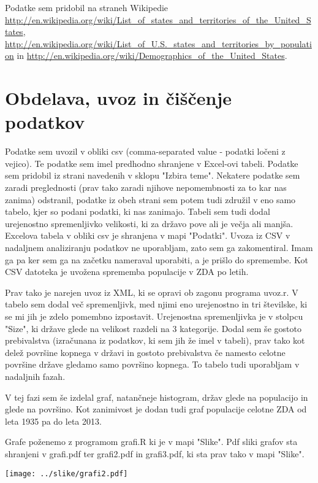 \documentclass[11pt,a4paper]{article}
\begin{document}
Podatke sem pridobil na straneh Wikipedie \url{http://en.wikipedia.org/wiki/List_of_states_and_territories_of_the_United_States}, \url{http://en.wikipedia.org/wiki/List_of_U.S._states_and_territories_by_population} in \url{http://en.wikipedia.org/wiki/Demographics_of_the_United_States}.

\pagebreak

\section{Obdelava, uvoz in čiščenje podatkov}

Podatke sem uvozil v obliki csv (comma-separated value - podatki ločeni z vejico). Te podatke sem imel predhodno shranjene v Excel-ovi tabeli. Podatke sem pridobil iz strani navedenih v sklopu "Izbira teme". 
Nekatere podatke sem zaradi preglednosti (prav tako zaradi njihove nepomembnosti za to kar nas zanima) odstranil, podatke iz obeh strani sem potem tudi združil v eno samo tabelo, kjer so podani podatki, ki nas zanimajo. Tabeli sem tudi dodal urejenostno spremenljivko velikosti, ki za državo pove ali je večja ali manjša. Excelova tabela v obliki csv je shranjena v mapi "Podatki".
Uvoza iz CSV v nadaljnem analiziranju podatkov ne uporabljam, zato sem ga zakomentiral. Imam ga pa ker sem ga na začetku nameraval uporabiti, a je prišlo do spremembe.
Kot CSV datoteka je uvožena sprememba populacije v ZDA po letih.

Prav tako je narejen uvoz iz XML, ki se opravi ob zagonu programa uvoz.r. V tabelo sem dodal več spremenljivk, med njimi eno urejenostno in tri številske, ki se mi jih je zdelo pomembno 
izpostavit. Urejenostna spremenljivka je v stolpcu "Size", ki države glede na velikost razdeli na 3 kategorije. Dodal sem še gostoto prebivalstva (izračunana iz podatkov, ki sem jih že imel v tabeli), prav tako kot delež površine kopnega v državi in gostoto prebivalstva če namesto celotne površine države gledamo samo površino kopnega. To tabelo tudi uporabljam v nadaljnih fazah.

V tej fazi sem še izdelal graf, natančneje histogram, držav glede na populacijo in glede na površino.
Kot zanimivost je dodan tudi graf populacije celotne ZDA od leta 1935 pa do leta 2013. 

Grafe poženemo z programom grafi.R ki je v mapi "Slike". Pdf sliki grafov sta shranjeni v 
grafi.pdf ter grafi2.pdf in grafi3.pdf,  ki sta prav tako v mapi "Slike".

\texttt{[image: ../slike/grafi2.pdf]}
\end{document}
